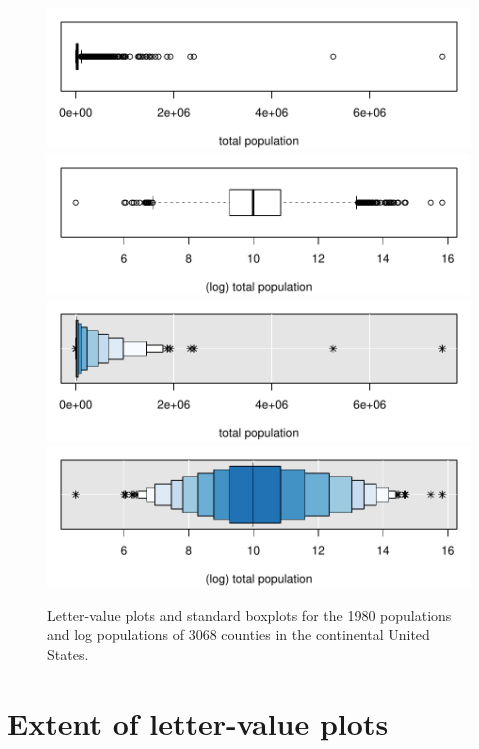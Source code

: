 \documentclass[oneside]{article}
\begin{document}
\begin{figure}[hbtp]
  \centering
 	\includegraphics[scale=.5]{counties-lvpop-a.pdf}
 	\includegraphics[scale=.5]{counties-lvpop-c.pdf}
 	\includegraphics[scale=.5]{counties-lvpop-b.pdf}
 	\includegraphics[scale=.5]{counties-lvpop-d.pdf}
 
  \caption{Letter-value plots and standard boxplots for the 1980
  populations and log populations of 3068 counties in the continental United
  States.}
  \label{lvpops} 
\end{figure}

\section{Extent of letter-value plots}
\label{sec:extent}
\end{document}

